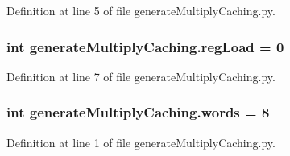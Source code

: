 Definition at line 5 of file generate\-Multiply\-Caching.\-py.

\hypertarget{namespacegenerateMultiplyCaching_a9ea896a1cc1f751747061991f2021507}{
\subsubsection[{reg\-Load}]{\setlength{\rightskip}{0pt plus 5cm}int generate\-Multiply\-Caching.\-reg\-Load = 0}}\label{namespacegenerateMultiplyCaching_a9ea896a1cc1f751747061991f2021507}


Definition at line 7 of file generate\-Multiply\-Caching.\-py.

\hypertarget{namespacegenerateMultiplyCaching_ac3df1f039897c06d1982bc218444fa01}{
\subsubsection[{words}]{\setlength{\rightskip}{0pt plus 5cm}int generate\-Multiply\-Caching.\-words = 8}}\label{namespacegenerateMultiplyCaching_ac3df1f039897c06d1982bc218444fa01}


Definition at line 1 of file generate\-Multiply\-Caching.\-py.

